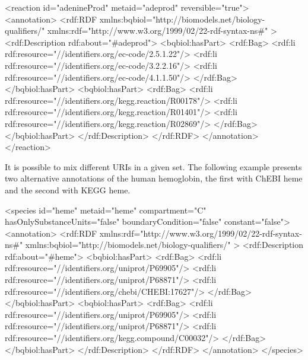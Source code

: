 \begin{example}
<reaction id="adenineProd" metaid="adeprod" reversible="true">
  <annotation>
    <rdf:RDF
      xmlns:bqbiol="http://biomodels.net/biology-qualifiers/"
      xmlns:rdf="http://www.w3.org/1999/02/22-rdf-syntax-ns\#"
    >
      <rdf:Description rdf:about="\#adeprod">
        <bqbiol:hasPart>
          <rdf:Bag>
            <rdf:li rdf:resource="//identifiers.org/ec-code/2.5.1.22\!"/>
            <rdf:li rdf:resource="//identifiers.org/ec-code/3.2.2.16\!"/>
            <rdf:li rdf:resource="//identifiers.org/ec-code/4.1.1.50\!"/>
          </rdf:Bag>
        </bqbiol:hasPart>
        <bqbiol:hasPart>
          <rdf:Bag>
            <rdf:li rdf:resource="//identifiers.org/kegg.reaction/R00178\!"/>
            <rdf:li rdf:resource="//identifiers.org/kegg.reaction/R01401\!"/>
            <rdf:li rdf:resource="//identifiers.org/kegg.reaction/R02869\!"/>
          </rdf:Bag>
        </bqbiol:hasPart>
      </rdf:Description>
    </rdf:RDF>
  </annotation>
</reaction>
\end{example}

It is possible to mix different URIs in a given set. The
following example presents two alternative annotations of the human
hemoglobin, the first with ChEBI heme and the second with KEGG
heme.

\begin{example}
<species id="heme" metaid="heme" compartment="C"
         hasOnlySubstanceUnits="false" boundaryCondition="false"
         constant="false">
  <annotation>
    <rdf:RDF
      xmlns:rdf="http://www.w3.org/1999/02/22-rdf-syntax-ns\#"
      xmlns:bqbiol="http://biomodels.net/biology-qualifiers/"
    >
     <rdf:Description rdf:about="\#heme">
       <bqbiol:hasPart>
         <rdf:Bag>
           <rdf:li rdf:resource="//identifiers.org/uniprot/P69905\!"/>
           <rdf:li rdf:resource="//identifiers.org/uniprot/P68871\!"/>
           <rdf:li rdf:resource="//identifiers.org/chebi/CHEBI:17627\!"/>
         </rdf:Bag>
       </bqbiol:hasPart>
       <bqbiol:hasPart>
         <rdf:Bag>
           <rdf:li rdf:resource="//identifiers.org/uniprot/P69905\!"/>
           <rdf:li rdf:resource="//identifiers.org/uniprot/P68871\!"/>
           <rdf:li rdf:resource="//identifiers.org/kegg.compound/C00032\!"/>
         </rdf:Bag>
       </bqbiol:hasPart>
     </rdf:Description>
   </rdf:RDF>
  </annotation>
</species>
\end{example}

